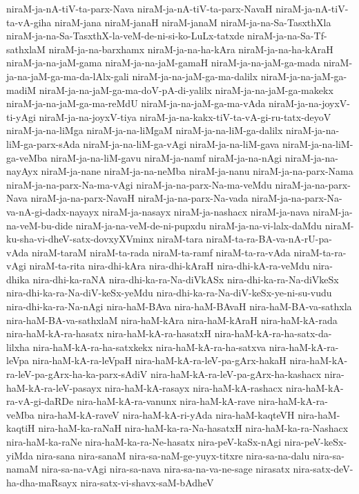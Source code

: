 {niraM-ja-nA-tiV-ta-parx-Nava
niraM-ja-nA-tiV-ta-parx-NavaH
niraM-ja-nA-tiV-ta-vA-giha
niraM-jana
niraM-janaH
niraM-janaM
niraM-ja-na-Sa-TasxthXla
niraM-ja-na-Sa-TasxthX-la-veM-de-ni-si-ko-LuLx-tatxde
niraM-ja-na-Sa-Tf-sathxlaM
niraM-ja-na-barxhamx
niraM-ja-na-ha-kAra
niraM-ja-na-ha-kAraH
niraM-ja-na-jaM-gama
niraM-ja-na-jaM-gamaH
niraM-ja-na-jaM-ga-mada
niraM-ja-na-jaM-ga-ma-da-lAlx-gali
niraM-ja-na-jaM-ga-ma-dalilx
niraM-ja-na-jaM-ga-madiM
niraM-ja-na-jaM-ga-ma-doV-pA-di-yalilx
niraM-ja-na-jaM-ga-makekx
niraM-ja-na-jaM-ga-ma-reMdU
niraM-ja-na-jaM-ga-ma-vAda
niraM-ja-na-joyxV-ti-yAgi
niraM-ja-na-joyxV-tiya
niraM-ja-na-kakx-tiV-ta-vA-gi-ru-tatx-deyoV
niraM-ja-na-liMga
niraM-ja-na-liMgaM
niraM-ja-na-liM-ga-dalilx
niraM-ja-na-liM-ga-parx-sAda
niraM-ja-na-liM-ga-vAgi
niraM-ja-na-liM-gava
niraM-ja-na-liM-ga-veMba
niraM-ja-na-liM-gavu
niraM-ja-namf
niraM-ja-na-nAgi
niraM-ja-na-nayAyx
niraM-ja-nane
niraM-ja-na-neMba
niraM-ja-nanu
niraM-ja-na-parx-Nama
niraM-ja-na-parx-Na-ma-vAgi
niraM-ja-na-parx-Na-ma-veMdu
niraM-ja-na-parx-Nava
niraM-ja-na-parx-NavaH
niraM-ja-na-parx-Na-vada
niraM-ja-na-parx-Na-va-nA-gi-dadx-nayayx
niraM-ja-nasayx
niraM-ja-nashacx
niraM-ja-nava
niraM-ja-na-veM-bu-dide
niraM-ja-na-veM-de-ni-pupxdu
niraM-ja-na-vi-lalx-daMdu
niraM-ku-sha-vi-dheV-satx-dovxyXVminx
niraM-tara
niraM-ta-ra-BA-va-nA-rU-pa-vAda
niraM-taraM
niraM-ta-rada
niraM-ta-ramf
niraM-ta-ra-vAda
niraM-ta-ra-vAgi
niraM-ta-rita
nira-dhi-kAra
nira-dhi-kAraH
nira-dhi-kA-ra-veMdu
nira-dhika
nira-dhi-ka-raNA
nira-dhi-ka-ra-Na-diVkASx
nira-dhi-ka-ra-Na-diVkeSx
nira-dhi-ka-ra-Na-diV-keSx-yeMdu
nira-dhi-ka-ra-Na-diV-keSx-ye-ni-su-vudu
nira-dhi-ka-ra-Na-nAgi
nira-haM-BAva
nira-haM-BAvaH
nira-haM-BA-va-sathxla
nira-haM-BA-va-sathxlaM
nira-haM-kAra
nira-haM-kAraH
nira-haM-kA-rada
nira-haM-kA-ra-hasatx
nira-haM-kA-ra-hasatxH
nira-haM-kA-ra-ha-satx-da-lilxha
nira-haM-kA-ra-ha-satxkekx
nira-haM-kA-ra-ha-satxva
nira-haM-kA-ra-leVpa
nira-haM-kA-ra-leVpaH
nira-haM-kA-ra-leV-pa-gArx-hakaH
nira-haM-kA-ra-leV-pa-gArx-ha-ka-parx-sAdiV
nira-haM-kA-ra-leV-pa-gArx-ha-kashacx
nira-haM-kA-ra-leV-pasayx
nira-haM-kA-rasayx
nira-haM-kA-rashacx
nira-haM-kA-ra-vA-gi-daRDe
nira-haM-kA-ra-vanunx
nira-haM-kA-rave
nira-haM-kA-ra-veMba
nira-haM-kA-raveV
nira-haM-kA-ri-yAda
nira-haM-kaqteVH
nira-haM-kaqtiH
nira-haM-ka-raNaH
nira-haM-ka-ra-Na-hasatxH
nira-haM-ka-ra-Nashacx
nira-haM-ka-raNe
nira-haM-ka-ra-Ne-hasatx
nira-peV-kaSx-nAgi
nira-peV-keSx-yiMda
nira-sana
nira-sanaM
nira-sa-naM-ge-yuyx-titxre
nira-sa-na-dalu
nira-sa-namaM
nira-sa-na-vAgi
nira-sa-nava
nira-sa-na-va-ne-sage
nirasatx
nira-satx-deV-ha-dha-maRsayx
nira-satx-vi-shavx-saM-bAdheV
}
